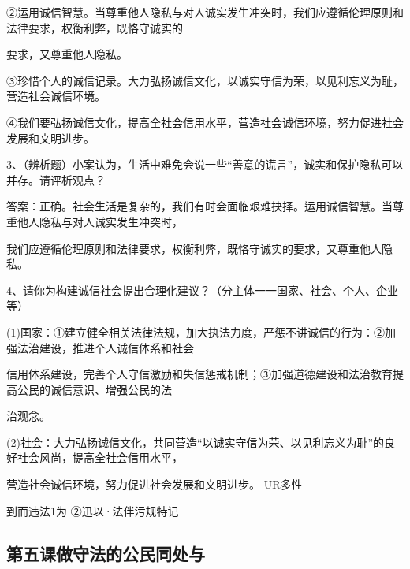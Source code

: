 \documentclass[lang=cn,11pt]{elegantbook}
\newcommand{\daofasym}[1]{{\daofasymbolfont #1}}
\newcommand{\daofasym}[1]{#1}
\begin{document}
\daofasym{②}运用诚信智慧。当尊重他人隐私与对人诚实发生冲突时，我们应遵循伦理原则和法律要求，权衡利弊，既恪守诚实的\par

要求，又尊重他人隐私。\par

\daofasym{③}珍惜个人的诚信记录。大力弘扬诚信文化，以诚实守信为荣，以见利忘义为耻，营造社会诚信环境。\par

\daofasym{④}我们要弘扬诚信文化，提高全社会信用水平，营造社会诚信环境，努力促进社会发展和文明进步。\par

3、（辨析题）小案认为，生活中难免会说一些“善意的谎言”，诚实和保护隐私可以并存。请评析观点？\par

答案：正确。社会生活是复杂的，我们有时会面临艰难抉择。运用诚信智慧。当尊重他人隐私与对人诚实发生冲突时，\par

我们应遵循伦理原则和法律要求，权衡利弊，既恪守诚实的要求，又尊重他人隐私。\par

4、请你为构建诚信社会提出合理化建议？（分主体一一国家、社会、个人、企业等）\par

(1)国家：\daofasym{①}建立健全相关法律法规，加大执法力度，严惩不讲诚信的行为：\daofasym{②}加强法治建设，推进个人诚信体系和社会\par

信用体系建设，完善个人守信激励和失信惩戒机制；\daofasym{③}加强道德建设和法治教育提高公民的诚信意识、增强公民的法\par

治观念。\par

(2)社会：大力弘扬诚信文化，共同营造“以诚实守信为荣、以见利忘义为耻”的良好社会风尚，提高全社会信用水平，\par

营造社会诚信环境，努力促进社会发展和文明进步。 UR多性\par

到而违法1为 \daofasym{②}迅以·法伴污规特记\par

\subsection*{第五课做守法的公民同处与}
\end{document}
